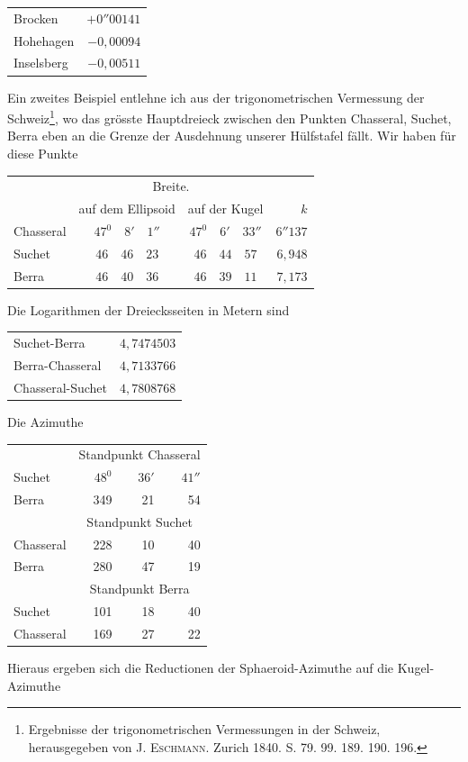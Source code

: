 %
\begin{center}
\begin{tabular}{lr}
Brocken&\(+0''00141\)\\
Hohehagen&\(-0{,}00094\)\\
Inselsberg&\(-0{,}00511\)
\end{tabular}
\end{center}
\hspace*{\parindent}Ein zweites Beispiel entlehne ich aus der trigonometrischen Vermessung der Schweiz\footnote{Ergebnisse der trigonometrischen Vermessungen in der Schweiz, herausgegeben von J. \textsc{Eschmann}. Zurich 1840. S. 79. 99. 189. 190. 196.}, wo das grösste Hauptdreieck zwischen den Punkten Chasseral, Suchet, Berra eben an die Grenze der Ausdehnung unserer Hülfstafel fällt. Wir haben für diese Punkte
\begin{center}
\begin{tabular}{l|c|c|r}
&\multicolumn{2}{c|}{Breite.}&\\
&auf dem Ellipsoid&auf der Kugel&\(k\)\\\hline
Chasseral&\(47^0\quad8'\quad1''\)&\(47^0\quad6'\quad33''\)&\(6''137\)\\
Suchet&\(46\quad46\quad23\)&\(46\quad44\quad57\)&\(6{,}948\)\\
Berra&\(46\quad40\quad36\)&\(46\quad39\quad11\)&\(7{,}173\)
\end{tabular}
\end{center}
Die Logarithmen der Dreiecksseiten in Metern sind
\begin{center}
\begin{tabular}{lr}
Suchet-Berra&\(4{,}7474503\)\\
Berra-Chasseral&\(4{,}7133766\)\\
Chasseral-Suchet&\(4{,}7808768\)
\end{tabular}
\end{center}
Die Azimuthe
\begin{center}
\begin{tabular}{lrrr}
&\multicolumn{3}{c}{Standpunkt Chasseral}\\
Suchet&\(48^0\)&\(36'\)&\(41''\)\\
Berra&349&21&54\\
&\multicolumn{3}{c}{Standpunkt Suchet}\\
Chasseral&228&10&40\\
Berra&280&47&19\\
&\multicolumn{3}{c}{Standpunkt Berra}\\
Suchet&101&18&40\\
Chasseral&169&27&22
\end{tabular}
\end{center}
\hspace*{\parindent}Hieraus ergeben sich die Reductionen der Sphaeroid-Azimuthe auf die Kugel-Azimuthe
